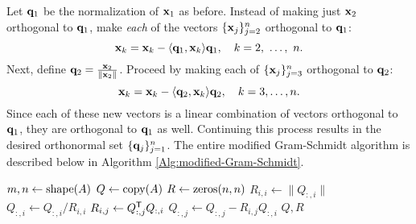 Let $\mathbf{q}_1$ be the normalization of $\mathbf{x}_1$ as before.
Instead of making just $\mathbf{x}_2$ orthogonal to $\mathbf{q}_1$, make \emph{each} of the vectors $\{\mathbf{x}_j\}_{j=2}^n$ orthogonal to $\mathbf{q}_1$:
\[\mathbf{x}_k = \mathbf{x}_k - \langle \mathbf{q}_1,\mathbf{x}_{k} \rangle \mathbf{q}_1,\quad k=2,\ \ldots,\ n.\]
Next, define $\mathbf{q}_2 = \frac{\mathbf{x}_2}{\|\mathbf{x}_2\|}$.
Proceed by making each of $\{\mathbf{x}_j\}_{j=3}^n$ orthogonal to $\mathbf{q}_2$:
\[\mathbf{x}_k = \mathbf{x}_k - \langle \mathbf{q}_2,\mathbf{x}_{k} \rangle \mathbf{q}_2,\quad k=3,\ldots,n.\]
Since each of these new vectors is a linear combination of vectors orthogonal to $\mathbf{q}_1$, they are orthogonal to $\mathbf{q}_1$ as well.
Continuing this process results in the desired orthonormal set $\{\mathbf{q}_j\}_{j=1}^n$.
The entire modified Gram-Schmidt algorithm is described below in Algorithm \ref{Alg:modified-Gram-Schmidt}.

\begin{algorithm}[H]
\begin{algorithmic}[1]
    \State $m, n \gets \mathrm{shape}(A)$
    \State $Q \gets \mathrm{copy}(A)$
    \State $R \gets \zeros{n}{n}$
        \State $R_{i,i} \gets \|Q_{:,i}\|$\label{step:mgs-normalize}
        \State $Q_{:,i} \gets Q_{:,i}/R_{i,i}$\label{step:mgs-mult1}
            \State $R_{i,j} \gets Q_{:,j}^{\mathsf T}  Q_{:,i}$\label{step:mgs-mult2}
            \State $Q_{:,j} \gets Q_{:,j}-R_{i,j}Q_{:,i}$\label{step:mgs-mult3}
        \EndFor
    \EndFor
    \State {} $Q, R$
\EndProcedure
\end{algorithmic}
\caption{}
\label{Alg:modified-Gram-Schmidt}
\end{algorithm}


